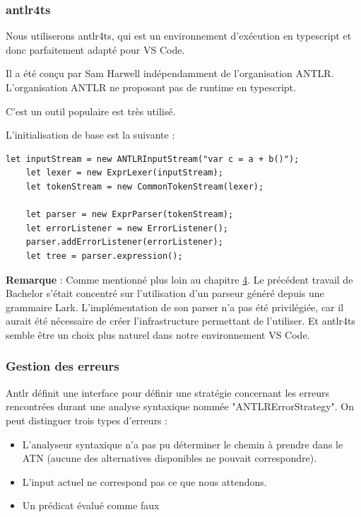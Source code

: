 \documentclass[
    iict, %
    il, %
]{heig-tb}
\begin{document}
\subsubsection{antlr4ts}
Nous utiliserons antlr4ts, qui est un environnement d'exécution en typescript et donc parfaitement adapté pour VS Code.

Il a été conçu par Sam Harwell indépendamment de l'organisation ANTLR.
L'organisation ANTLR ne proposant pas de runtime en typescript. %



C'est un outil populaire est très utilisé.

L'initialisation de base est la suivante :

\begin{lstlisting}[frame=single,caption={antlr-setup},label={antlr-setup}]
    let inputStream = new ANTLRInputStream("var c = a + b()");
    let lexer = new ExprLexer(inputStream);
    let tokenStream = new CommonTokenStream(lexer);

    let parser = new ExprParser(tokenStream);
    let errorListener = new ErrorListener();
    parser.addErrorListener(errorListener);
    let tree = parser.expression();
\end{lstlisting}

\textbf{Remarque} :
Comme mentionné plus loin au chapitre \hyperref[grammar scope]{4}. Le précédent travail de Bachelor s'était concentré sur l'utilisation d'un parseur généré depuis une grammaire Lark.
L'implémentation de son parser n'a pas été privilégiée, car il aurait été nécessaire de créer l'infrastructure permettant de l'utiliser.
Et antlr4ts semble être un choix plus naturel dans notre environnement VS Code.


\subsubsection{Gestion des erreurs}


Antlr définit une interface pour définir une stratégie concernant les erreurs rencontrées durant une analyse syntaxique nommée "ANTLRErrorStrategy".
On peut distinguer trois types d'erreurs :
\begin{itemize}
    \item L'analyseur syntaxique n'a pas pu déterminer le chemin à prendre dans le ATN (aucune des alternatives disponibles ne pouvait correspondre).
    \item L'input actuel ne correspond pas ce que nous attendons.
    \item Un prédicat évalué comme faux
\end{itemize}
\end{document}
